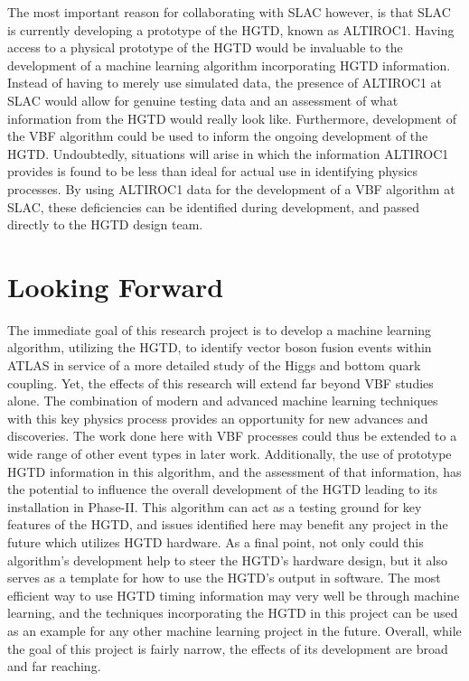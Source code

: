 \documentclass[12pt,letterpaper]{article}
\begin{document}
    The most important reason for collaborating with SLAC however, is that SLAC is currently developing a prototype of the HGTD, known as ALTIROC1. Having access to a physical prototype of the HGTD would be invaluable to the development of a machine learning algorithm incorporating HGTD information. Instead of having to merely use simulated data, the presence of ALTIROC1 at SLAC would allow for genuine testing data and an assessment of what information from the HGTD would really look like. Furthermore, development of the VBF algorithm could be used to inform the ongoing development of the HGTD. Undoubtedly, situations will arise in which the information ALTIROC1 provides is found to be less than ideal for actual use in identifying physics processes. By using ALTIROC1 data for the development of a VBF algorithm at SLAC, these deficiencies can be identified during development, and passed directly to the HGTD design team. 




\section*{Looking Forward}
    The immediate goal of this research project is to develop a machine learning algorithm, utilizing the HGTD, to identify vector boson fusion events within ATLAS in service of a more detailed study of the Higgs and bottom quark coupling. Yet, the effects of this research will extend far beyond VBF studies alone. The combination of modern and advanced machine learning techniques with this key physics process provides an opportunity for new advances and discoveries. The work done here with VBF processes could thus be extended to a wide range of other event types in later work. Additionally, the use of prototype HGTD information in this algorithm, and the assessment of that information, has the potential to influence the overall development of the HGTD leading to its installation in Phase-II. This algorithm can act as a testing ground for key features of the HGTD, and issues identified here may benefit any project in the future which utilizes HGTD hardware. As a final point, not only could this algorithm's development help to steer the HGTD's hardware design, but it also serves as a template for how to use the HGTD's output in software. The most efficient way to use HGTD timing information may very well be through machine learning, and the techniques incorporating the HGTD in this project can be used as an example for any other machine learning project in the future. Overall, while the goal of this project is fairly narrow, the effects of its development are broad and far reaching.




\newpage
\begin{appendix}
\end{appendix}





\end{document}
